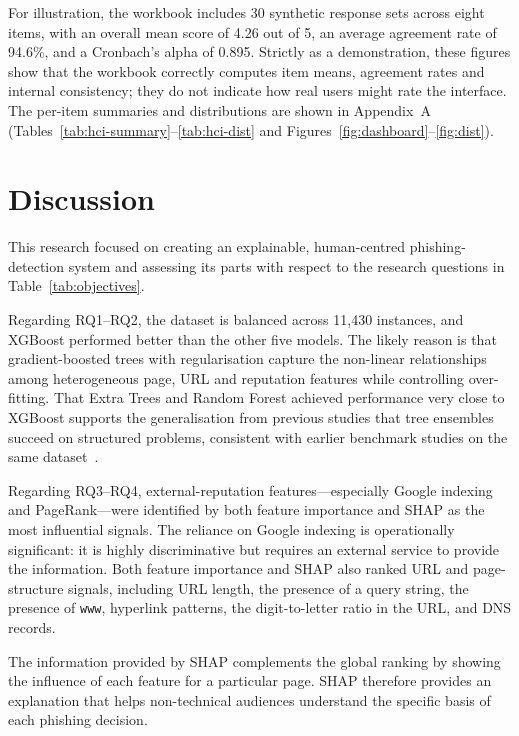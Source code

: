 \documentclass[11pt,a4paper]{article}
\begin{document}
For illustration, the workbook includes 30 synthetic response sets across eight items, with an
overall mean score of 4.26 out of 5, an average agreement rate of 94.6\%, and a Cronbach's alpha
of 0.895. Strictly as a demonstration, these figures show that the workbook correctly computes
item means, agreement rates and internal consistency; they do not indicate how real users might
rate the interface. The per-item summaries and distributions are shown in Appendix~A
(Tables~\ref{tab:hci-summary}--\ref{tab:hci-dist} and Figures~\ref{fig:dashboard}--\ref{fig:dist}).

\section{Discussion}

This research focused on creating an explainable, human-centred phishing-detection system and
assessing its parts with respect to the research questions in Table~\ref{tab:objectives}.

Regarding RQ1--RQ2, the dataset is balanced across 11{,}430 instances, and XGBoost performed
better than the other five models. The likely reason is that gradient-boosted trees with
regularisation capture the non-linear relationships among heterogeneous page, URL and
reputation features while controlling over-fitting. That Extra Trees and Random Forest achieved
performance very close to XGBoost supports the generalisation from previous studies that tree
ensembles succeed on structured problems, consistent with earlier benchmark studies on the same
dataset~\cite{ref2}.

Regarding RQ3--RQ4, external-reputation features---especially Google indexing and
PageRank---were identified by both feature importance and SHAP as the most influential signals.
The reliance on Google indexing is operationally significant: it is highly discriminative but
requires an external service to provide the information. Both feature importance and SHAP also
ranked URL and page-structure signals, including URL length, the presence of a query string,
the presence of \texttt{www}, hyperlink patterns, the digit-to-letter ratio in the URL, and DNS
records.

The information provided by SHAP complements the global ranking by showing the influence of each
feature for a particular page. SHAP therefore provides an explanation that helps non-technical
audiences understand the specific basis of each phishing decision.
\end{document}
